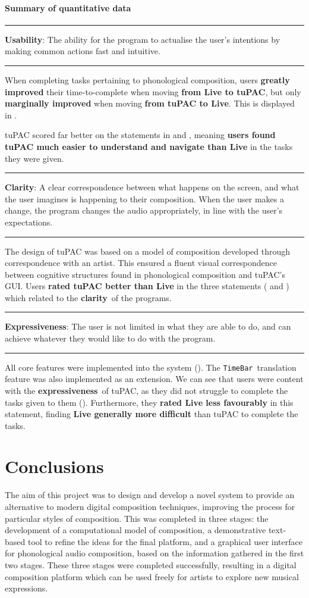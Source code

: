 \documentclass[12pt,a4paper,oneside,openright]{report}
\newcommand{\timebar}{\texttt{TimeBar}}
\newcommand{\clarity}{\textbf{clarity}}
\newcommand{\expressiveness}{\textbf{expressiveness}}
\newcommand{\Usability}{\textbf{Usability}}
\newcommand{\Clarity}{\textbf{Clarity}}
\newcommand{\Expressiveness}{\textbf{Expressiveness}}
\newcommand{\statement}[1]{\vspace{1em}
\hrule
\begin{center}
#1
\end{center}
\vspace{1em}
\hrule}
\begin{document}
\clearpage
\subsubsection{Summary of quantitative data}
\statement{\Usability: The ability for the program to actualise the user's intentions by making common actions fast and intuitive.}

When completing tasks pertaining to phonological composition, users \textbf{greatly improved} their time-to-complete when moving \textbf{from Live to tuPAC}, but only \textbf{marginally improved} when moving \textbf{from tuPAC to Live}. This is displayed in .

tuPAC scored far better on the statements in  and , meaning \textbf{users found tuPAC much easier to understand and navigate than Live} in the tasks they were given.

\statement{\Clarity: A clear correspondence between what happens on the screen, and what the user imagines is happening to their composition. When the user makes a change, the program changes the audio appropriately, in line with the user's expectations.}

The design of tuPAC was based on a model of composition developed through correspondence with an artist. This ensured a fluent visual correspondence between cognitive structures found in phonological composition and tuPAC's GUI. Users \textbf{rated tuPAC better than Live} in the three statements ( and ) which related to the \clarity\ of the programs.

\statement{\Expressiveness: The user is not limited in what they are able to do, and can achieve whatever they would like to do with the program.}
All core features were implemented into the system (). The \timebar\ translation feature was also implemented as an extension. We can see that users were content with the \expressiveness\ of tuPAC, as they did not struggle to complete the tasks given to them (). Furthermore, they \textbf{rated Live less favourably} in this statement, finding \textbf{Live generally more difficult} than tuPAC to complete the tasks.

\chapter{Conclusions}
The aim of this project was to design and develop a novel system to provide an alternative to modern digital composition techniques, improving the process for particular styles of composition. This was completed in three stages: the development of a computational model of composition, a demonstrative text-based tool to refine the ideas for the final platform, and a graphical user interface for phonological audio composition, based on the information gathered in the first two stages. These three stages were completed successfully, resulting in a digital composition platform which can be used freely for artists to explore new musical expressions.
\end{document}
